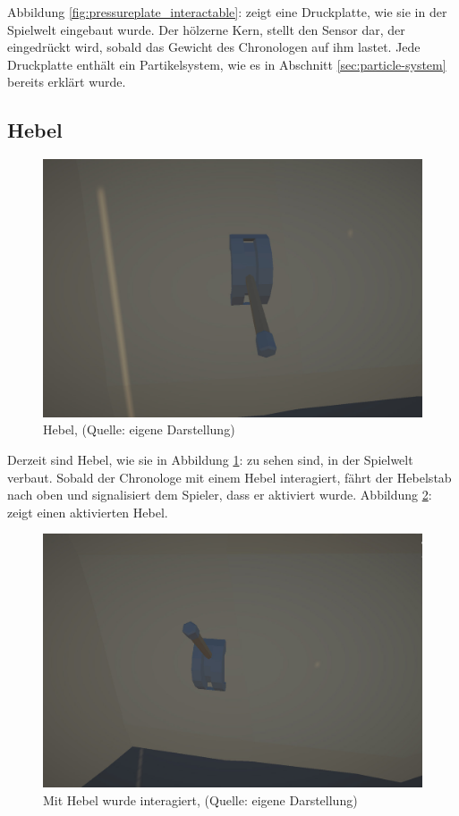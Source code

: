 Abbildung \ref{fig:pressureplate_interactable}:  zeigt eine Druckplatte, wie sie in der Spielwelt eingebaut wurde. Der hölzerne Kern, stellt den Sensor dar, der eingedrückt wird, sobald das Gewicht des Chronologen auf ihm lastet. Jede Druckplatte enthält ein Partikelsystem, wie es in Abschnitt \ref{sec:particle-system}  bereits erklärt wurde.

\subsection{Hebel}\label{sec:concept_interface_lever}

\begin{figure}[ht]
\centering
\includegraphics[width=0.8\linewidth]{content/pictures/Lever.jpg}
\caption{Hebel, (Quelle: eigene Darstellung)}
\label{fig:lever_interactable}
\end{figure}

Derzeit sind Hebel, wie sie in Abbildung \ref{fig:lever_interactable}:  zu sehen sind, in der Spielwelt verbaut. Sobald der Chronologe mit einem Hebel interagiert, fährt der Hebelstab nach oben und signalisiert dem Spieler, dass er aktiviert wurde. Abbildung \ref{fig:lever_interactable_active}:  zeigt einen aktivierten Hebel.

\begin{figure}[ht]
\centering
\includegraphics[width=0.8\linewidth]{content/pictures/Lever_active.jpg}
\caption{Mit Hebel wurde interagiert, (Quelle: eigene Darstellung)}
\label{fig:lever_interactable_active}
\end{figure}


